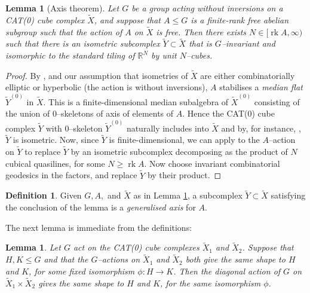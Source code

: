 \documentclass[11pt,oneside]{amsart}
\newcounter{ax}
\newtheorem{lem}[thm]{Lemma}
\theoremstyle{definition}
\newtheorem{defn}[thm]{Definition}
\DeclareMathOperator{\rank}{rk}
\newcommand{\field}[1]{\mathbb{#1}}
\newcommand{\reals}{\ensuremath{\field{R}}}
\begin{document}
\begin{lem}[Axis theorem]\label{lem:generalised-axis}
Let $G$ be a group acting without inversions on a CAT(0) cube complex $\widetilde X$, and suppose that $A\leq G$ is a finite-rank free abelian subgroup such that the action of $A$ on $\widetilde X$ is free.  Then there exists $N\in[\rank A,\infty)$ such that there is an isometric subcomplex $\widetilde Y\subset\widetilde X$ that is $G$--invariant and isomorphic to the standard tiling of $\reals^N$ by unit $N$--cubes.
\end{lem}

\begin{proof}
By \cite[Lem. 5.6]{Genevois}, and our assumption that isometries of $\widetilde X$ are either combinatorially elliptic or hyperbolic (the action is without inversions), $A$ stabilises a \emph{median flat} $\widetilde Y^{(0)}$ in $\widetilde X$.  This is a finite-dimensional median subalgebra of $\widetilde X^{(0)}$ consisting of the union of $0$--skeletons of axis of elements of $A$.  Hence the CAT(0) cube complex $\widetilde Y$ with $0$--skeleton $\widetilde Y^{(0)}$ naturally includes into $\widetilde X$ and by, for instance, \cite[Lem. 2.11]{HagenPetyt}, $\widetilde Y$ is isometric.  Now, since $\widetilde Y$ is finite-dimensional, we can apply \cite[Thm. 4.3]{Woodhouse:axis} to the $A$--action on $\widetilde Y$ to replace $\widetilde Y$ by an isometric subcomplex decomposing as the product of $N$ cubical quasilines, for some $N\geq \rank A$.  Now choose invariant combinatorial geodesics in the factors, and replace $\widetilde Y$ by their product.
\end{proof}

\begin{defn}\label{defn:generalised-axis}
Given $G,A,$ and $\widetilde X$ as in Lemma \ref{lem:generalised-axis}, a subcomplex $\widetilde Y\subset\widetilde X$ satisfying the conclusion of the lemma is a \emph{generalised axis} for $A$.
\end{defn}

The next lemma is immediate from the definitions:


\begin{lem}\label{lem:shapes-and-products}
Let $G$ act on the CAT(0) cube complexes $\widetilde X_1$ and $\widetilde X_2$.  Suppose that $H,K\leq G$ and that the $G$--actions on $\widetilde X_1$ and $\widetilde X_2$ both give the same shape to $H$ and $K$, for some fixed isomorphism $\phi:H\to K$.  Then the diagonal action of $G$ on $\widetilde X_1\times\widetilde X_2$ gives the same shape to $H$ and $K$, for the same isomorphism $\phi$.
\end{lem}
\end{document}
